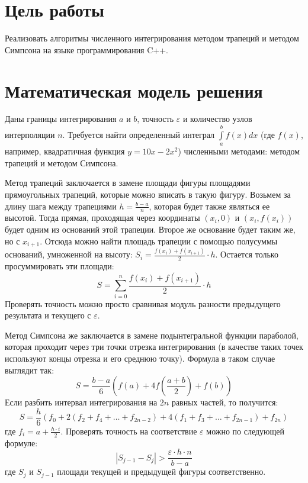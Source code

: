 \documentclass[a4paper]{article}
\begin{document}

\setcounter{page}{2}  %
\fontsize{14pt}{18pt}\selectfont

\section{Цель работы}
Реализовать алгоритмы численного интегрирования методом трапеций и методом
Симпсона на языке программирования C++.

\section{Математическая модель решения}
Даны границы интегрирования $a$ и $b$, точность $\varepsilon$ и количество узлов
интерполяции $n$.
Требуется найти определенный интеграл $\int\limits_a^b f(x)dx$
(где $f(x)$, например, квадратичная функция $y=10x-2x^2$) численными методами:
методом трапеций и методом Симпсона.

Метод трапеций заключается в замене площади фигуры площадями прямоугольных
трапеций, которые можно вписать в такую фигуру.
Возьмем за длину шага между трапециями
$h=\frac{b-a}{n}$, которая будет также являться ее высотой.
Тогда прямая, проходящая через координаты $(x_i, 0)$ и $(x_i, f(x_i))$ будет
одним из оснований этой трапеции.
Второе же основание будет таким же, но с $x_{i+1}$.
Отсюда можно найти площадь трапеции с помощью полусуммы оснований,
умноженной на высоту: $S_i=\frac{f(x_i)+f(x_{i+1})}{2}\cdot h$.
Остается только просуммировать эти площади:
$$S=\sum_{i=0}^n\frac{f(x_i)+f(x_{i+1})}{2}\cdot h$$
Проверять точность можно просто сравнивая модуль разности предыдущего
результата и текущего с $\varepsilon$.

Метод Симпсона же заключается в замене подынтегральной функции параболой,
которая проходит через три точки отрезка интегрирования
(в качестве таких точек используют концы отрезка и его среднюю точку).
Формула в таком случае выглядит так:
$$S=\frac{b-a}{6}\left(f(a)+4f\left(\frac{a+b}{2}\right)+f(b)\right)$$
Если разбить интервал интегрирования на $2n$ равных частей, то получится:
$$S=\frac{h}{6}
(
    f_0
    + 2(f_2 + f_4 + \ldots + f_{2n-2})
    + 4(f_1 + f_3 + \ldots + f_{2n-1})
    + f_{2n}
)$$
где $f_i=a+\frac{h\cdot i}{2}$.
Проверять точность на соответствие $\varepsilon$ можно по следующей формуле:
$$|S_{j-1}-S_j| > \frac{\varepsilon\cdot h\cdot n}{b-a}$$
где $S_j$ и $S_{j-1}$ площади текущей и предыдущей фигуры соответственно.
\end{document}
